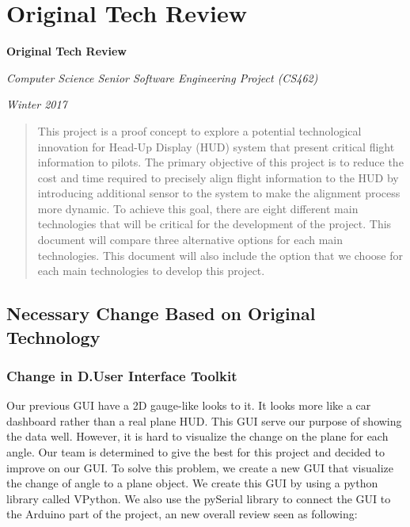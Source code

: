 \newpage
\section{Original Tech Review}
\def\TRtitle{Computer Science Senior Software Engineering Project (CS462)}
\def\TRterm{Winter 2017}

	\begin{center}
		\vspace{\fill}

		{\Huge\bfseries Original Tech Review\par}
		\vspace{0.5cm}
		{\Large\itshape \TRtitle\par}
		\vspace{0.5cm}
		{\Large\itshape \TRterm\par}
		
		\vspace{\fill}
	\end{center}
	
	\begin{abstract}
		This project is a proof concept to explore a potential technological innovation for Head-Up Display (HUD) system that present critical flight information to pilots. The primary objective of this project is to reduce the cost and time required to precisely align flight information to the HUD by introducing additional sensor to the system to make the alignment process more dynamic. To achieve this goal, there are eight different main technologies that will be critical for the development of the project. This document will compare three alternative options for each main technologies. This document will also include the option that we choose for each main technologies to develop this project. 
	\end{abstract}
	
	

	\subsection{Necessary Change Based on Original Technology}
		\subsubsection{Change in D.User Interface Toolkit}
			Our previous GUI have a 2D gauge-like looks to it. It looks more like a car dashboard rather than a real plane HUD. This GUI serve our purpose of showing the data well. However, it is hard to visualize the change on the plane for each angle. Our team is determined to give the best for this project and decided to improve on our GUI. To solve this problem, we create a new GUI that visualize the change of angle to a plane object. We create this GUI by using a python library called VPython. We also use the pySerial library to connect the GUI to the Arduino part of the project, an new overall review seen as following:\\

